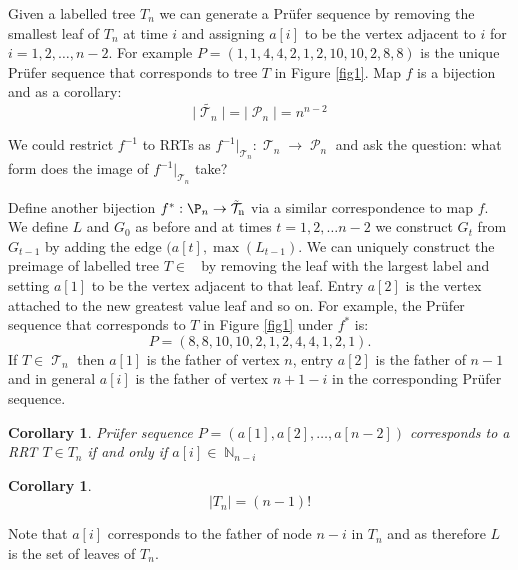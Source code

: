 \documentclass[oneside]{book} %
\newtheorem{cor}[thm]{Corollary}
\theoremstyle{definition}
\numberwithin{equation}{section}
\DeclareMathOperator{\T}{\mathcal{T}}
\DeclareMathOperator{\lT}{\tilde{\mathcal{T}}_n}
\DeclareMathOperator{\N}{\mathbb{N}}
\DeclareMathOperator{\Pruf}{\mathcal{P}} %
\begin{document}
Given a labelled tree $T_n$ we can generate a Pr\"{u}fer sequence by removing the smallest leaf of $T_n$ at time $i$ and assigning $a[i]$ to be the vertex adjacent to $i$ for $i = 1,2,\dots,n-2$. For example $P = (1,1,4,4,2,1,2,10,10,2,8,8)$ is the unique Pr\"{u}fer sequence that corresponds to tree $T$ in Figure \ref{fig1}. Map  $f$ is a bijection and as a corollary:
\[
 \lvert \tilde{\T_n} \rvert  = \lvert \Pruf_n \rvert  = n^{n-2} 
\]

We could restrict $f^{-1}$ to RRTs as $f^{-1} |_{\T_n}: \T_n \rightarrow \Pruf_n$ and ask the question: what form does the image of $f^{-1} |_{\T_n}$ take? 

Define another bijection $f^{*}: \P_n \rightarrow \lT$ via a similar correspondence to map $f$.  We define $L$ and $G_0$ as before and at times $t=1,2,\dots n-2$ we construct $G_t$ from $G_{t-1}$ by adding the edge $(a[t],\max(L_{t-1})$.  We can uniquely construct the preimage of labelled tree $T \in \lT$ by removing the leaf with the largest label and setting $a[1]$ to be the vertex adjacent to that leaf. Entry $a[2]$ is the vertex attached to the new greatest value leaf and so on.  For example, the Pr\"{u}fer sequence that corresponds to $T$ in Figure \ref{fig1} under $f^*$ is:
\[P = (8,8,10,10,2,1,2,4,4,1,2,1).\]
If $T\in \T_n$ then $a[1]$ is the father of vertex $n$, entry $a[2]$ is the father of $n-1$ and in general $a[i]$ is the father of vertex $n + 1-i$ in the corresponding Pr\"{u}fer sequence.
\begin{cor}
 Pr\"{u}fer sequence $P = (a[1],a[2],\dots,a[n-2])$ corresponds to a RRT $T \in T_n$ if and only if $a[i] \in \N_{n-i}$ 
\end{cor}

\begin{cor}
\[
 \lvert T_n \rvert  = (n-1)!
\]
\end{cor}
Note that $a[i]$ corresponds to the father of node $n-i$ in $T_n$ and as therefore $L$ is the set of leaves of $T_n$.  
\end{document}
